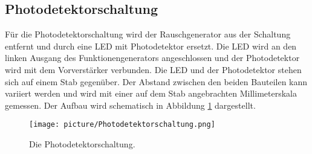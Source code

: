 \subsection{Photodetektorschaltung}
Für die Photodetektorschaltung wird der Rauschgenerator aus der Schaltung entfernt und durch eine LED mit Photodetektor ersetzt. Die LED wird an den linken Ausgang des Funktionengenerators angeschlossen und der Photodetektor wird mit dem Vorverstärker verbunden. Die LED und der Photodetektor stehen sich auf einem Stab gegenüber. Der Abstand zwischen den beiden Bauteilen kann variiert werden und wird mit einer auf dem Stab angebrachten Millimeterskala gemessen. Der Aufbau wird schematisch in Abbildung \ref{img:V2} dargestellt.
\begin{figure}[H]
	\centering
	\texttt{[image: picture/Photodetektorschaltung.png]}
	\caption{Die Photodetektorschaltung. \cite[5]{sample}}
  \label{img:V2}
\end{figure}
